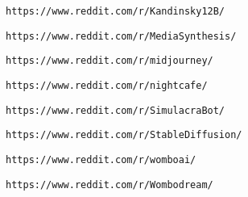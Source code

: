          
         
          \protect\hypertarget{ID_851655866}{}{}

\begin{verbatim}
https://www.reddit.com/r/Kandinsky12B/
\end{verbatim}
         

         
         
          \protect\hypertarget{ID_1686101999}{}{}

\begin{verbatim}
https://www.reddit.com/r/MediaSynthesis/
\end{verbatim}
         

         
         
          \protect\hypertarget{ID_1637951818}{}{}

\begin{verbatim}
https://www.reddit.com/r/midjourney/
\end{verbatim}
         

         
         
          \protect\hypertarget{ID_1939732119}{}{}

\begin{verbatim}
https://www.reddit.com/r/nightcafe/
\end{verbatim}
         

         
         
          \protect\hypertarget{ID_657753502}{}{}

\begin{verbatim}
https://www.reddit.com/r/SimulacraBot/
\end{verbatim}
         

         
         
          \protect\hypertarget{ID_252730754}{}{}

\begin{verbatim}
https://www.reddit.com/r/StableDiffusion/
\end{verbatim}
         

         
         
          \protect\hypertarget{ID_154480546}{}{}

\begin{verbatim}
https://www.reddit.com/r/womboai/
\end{verbatim}
         

         
         
          \protect\hypertarget{ID_1109973105}{}{}

\begin{verbatim}
https://www.reddit.com/r/Wombodream/
\end{verbatim}
         

